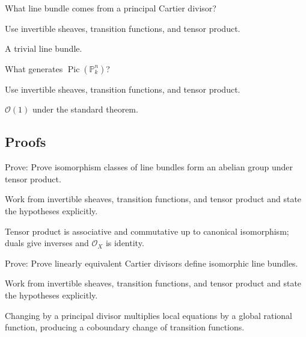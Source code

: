 \begin{exercise}\label{exr:vi42-expand-04}
What line bundle comes from a principal Cartier divisor?
\end{exercise}
\begin{hint}
Use invertible sheaves, transition functions, and tensor product.
\end{hint}
\begin{solution}
A trivial line bundle.
\end{solution}

\begin{exercise}\label{exr:vi42-expand-05}
What generates $\operatorname{Pic}(\mathbb P^n_k)$?
\end{exercise}
\begin{hint}
Use invertible sheaves, transition functions, and tensor product.
\end{hint}
\begin{solution}
$\mathcal O(1)$ under the standard theorem.
\end{solution}

\subsection*{Proofs}

\begin{exercise}\label{exr:vi42-expand-06}
Prove: Prove isomorphism classes of line bundles form an abelian group under tensor product.
\end{exercise}
\begin{hint}
Work from invertible sheaves, transition functions, and tensor product and state the hypotheses explicitly.
\end{hint}
\begin{solution}
Tensor product is associative and commutative up to canonical isomorphism; duals give inverses and $\mathcal O_X$ is identity.
\end{solution}

\begin{exercise}\label{exr:vi42-expand-07}
Prove: Prove linearly equivalent Cartier divisors define isomorphic line bundles.
\end{exercise}
\begin{hint}
Work from invertible sheaves, transition functions, and tensor product and state the hypotheses explicitly.
\end{hint}
\begin{solution}
Changing by a principal divisor multiplies local equations by a global rational function, producing a coboundary change of transition functions.
\end{solution}

